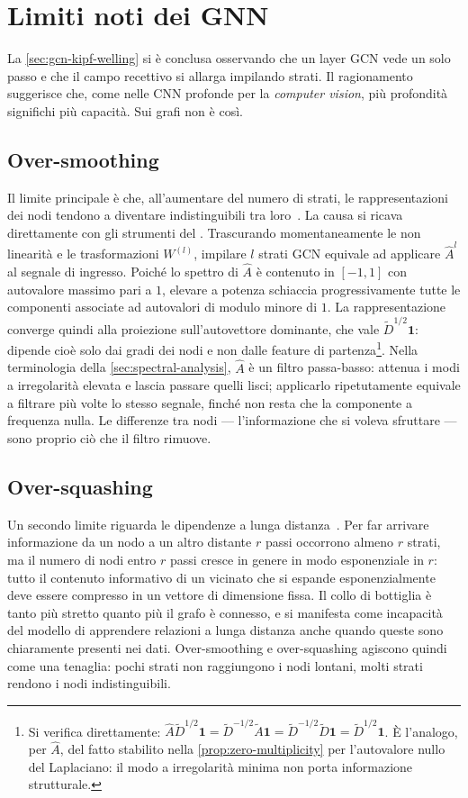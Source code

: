 \section{Limiti noti dei GNN}
\label{sec:known-limitations-gnn}

La \cref{sec:gcn-kipf-welling} si è conclusa osservando che un layer GCN vede un solo passo e che il campo recettivo si allarga impilando strati. Il ragionamento suggerisce che, come nelle CNN profonde per la \emph{computer vision}, più profondità significhi più capacità. Sui grafi non è così.

\subsection{Over-smoothing}
Il limite principale è che, all'aumentare del numero di strati, le rappresentazioni dei nodi tendono a diventare indistinguibili tra loro~\cite{li2018deeper}. La causa si ricava direttamente con gli strumenti del . Trascurando momentaneamente le non linearità e le trasformazioni $W^{(l)}$, impilare $l$ strati GCN equivale ad applicare $\hat A^l$ al segnale di ingresso. Poiché lo spettro di $\hat A$ è contenuto in $[-1,1]$ con autovalore massimo pari a $1$, elevare a potenza schiaccia progressivamente tutte le componenti associate ad autovalori di modulo minore di $1$. La rappresentazione converge quindi alla proiezione sull'autovettore dominante, che vale $\tilde D^{1/2}\mathbf{1}$: dipende cioè solo dai gradi dei nodi e non dalle feature di partenza\footnote{Si verifica direttamente: $\hat A\tilde D^{1/2}\mathbf1 = \tilde D^{-1/2}\tilde A\mathbf1 = \tilde D^{-1/2}\tilde D\mathbf1 = \tilde D^{1/2}\mathbf1$. È l'analogo, per $\hat A$, del fatto stabilito nella \cref{prop:zero-multiplicity} per l'autovalore nullo del Laplaciano: il modo a irregolarità minima non porta informazione strutturale.}. Nella terminologia della \cref{sec:spectral-analysis}, $\hat A$ è un filtro passa-basso: attenua i modi a irregolarità elevata e lascia passare quelli lisci; applicarlo ripetutamente equivale a filtrare più volte lo stesso segnale, finché non resta che la componente a frequenza nulla. Le differenze tra nodi — l'informazione che si voleva sfruttare — sono proprio ciò che il filtro rimuove.

\subsection{Over-squashing}
Un secondo limite riguarda le dipendenze a lunga distanza~\cite{alon2021bottleneck}. Per far arrivare informazione da un nodo a un altro distante $r$ passi occorrono almeno $r$ strati, ma il numero di nodi entro $r$ passi cresce in genere in modo esponenziale in $r$: tutto il contenuto informativo di un vicinato che si espande esponenzialmente deve essere compresso in un vettore di dimensione fissa. Il collo di bottiglia è tanto più stretto quanto più il grafo è connesso, e si manifesta come incapacità del modello di apprendere relazioni a lunga distanza anche quando queste sono chiaramente presenti nei dati. Over-smoothing e over-squashing agiscono quindi come una tenaglia: pochi strati non raggiungono i nodi lontani, molti strati rendono i nodi indistinguibili.

